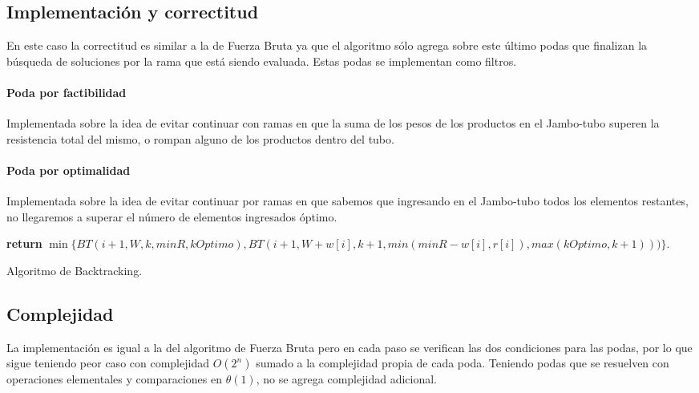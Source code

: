 \documentclass[10pt,a4paper]{article}
\begin{document}
\subsection{Implementación y correctitud}
En este caso la correctitud es similar a la de Fuerza Bruta ya que el algoritmo sólo agrega sobre este último podas que finalizan la búsqueda de soluciones por la rama que está siendo evaluada. Estas podas se implementan como filtros.

\paragraph{Poda por factibilidad}
Implementada sobre la idea de evitar continuar con ramas en que la suma de los pesos de los productos en el Jambo-tubo superen la resistencia total del mismo, o rompan alguno de los productos dentro del tubo.

\paragraph{Poda por optimalidad}
Implementada sobre la idea de evitar continuar por ramas en que sabemos que ingresando en el Jambo-tubo todos los elementos restantes, no llegaremos a superar el número de elementos ingresados óptimo.

\begin{algorithm}
	\begin{algorithmic}[1]

		\EndIf
		
		\EndIf
		
		\EndIf
		
		\State \textbf{return} $\min \{ BT(i+1, W, k, minR, kOptimo), BT(i+1, W+w[i], k+1, min(minR - w[i], r[i]), max(kOptimo, k+1))) \}$.
		
		\EndFunction
	\end{algorithmic}
	\caption{Algoritmo de Backtracking.}
	\label{alg:backtracking}
\end{algorithm}

\subsection{Complejidad}
La implementación es igual a la del algoritmo de Fuerza Bruta pero en cada paso se verifican las dos condiciones para las podas, por lo que sigue teniendo peor caso con complejidad $O(2^n)$ sumado a la complejidad propia de cada poda. Teniendo podas que se resuelven con operaciones elementales y comparaciones en $\theta(1)$, no se agrega complejidad adicional.
\end{document}
